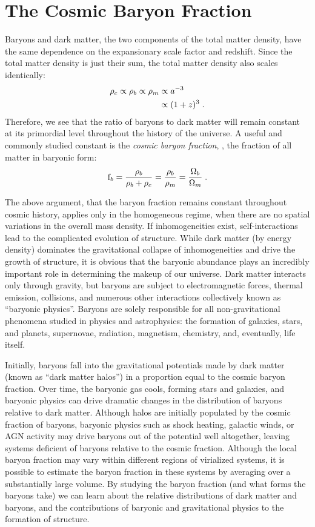 \section{The Cosmic Baryon Fraction}
\label{sec:Intro.Baryons}
Baryons and dark matter, the two components of the total matter
density, have the same dependence on the expansionary scale factor
and redshift. Since the total matter density is just their sum, the
total matter density also scales identically:
\begin{align}
\rho_c \propto \rho_b \propto \rho_m & \propto a^{-3} \nonumber \\
& \propto (1+z)^{3}\;. 
\end{align}
Therefore, we see that the ratio of baryons to dark matter will remain
constant at its primordial level throughout the history of the
universe. A useful and commonly studied constant is the \textit{cosmic
  baryon fraction}, \fb, the fraction of all matter in baryonic form:
\begin{equation}
\textrm{f\ensuremath{_b}} = \frac{\rho_b}{\rho_b + \rho_c} = \frac{\rho_b}{\rho_m} =
\frac{\Omega_b}{\Omega_m}\;.
\end{equation}

The above argument, that the baryon fraction remains constant
throughout cosmic history, applies only in the homogeneous regime,
when there are no spatial variations in the overall mass density. If
inhomogeneities exist, self-interactions lead to the complicated
evolution of structure. While dark matter (by energy density)
dominates the gravitational collapse of inhomogeneities and drive the
growth of structure, it is obvious that the baryonic abundance plays
an incredibly important role in determining the makeup of our
universe. Dark matter interacts only through gravity, but baryons are
subject to electromagnetic forces, thermal emission, collisions, and
numerous other interactions collectively known as ``baryonic
physics''. Baryons are solely responsible for all non-gravitational
phenomena studied in physics and astrophysics: the formation of
galaxies, stars, and planets, supernovae, radiation, magnetism,
chemistry, and, eventually, life itself. 

Initially, baryons fall into the gravitational potentials made by dark
matter (known as ``dark matter halos'') in a proportion equal to the cosmic baryon
fraction. Over time, the baryonic gas cools, forming stars and
galaxies, and baryonic physics can drive dramatic changes in the
distribution of baryons relative to dark matter. Although halos are
initially populated by the cosmic fraction of baryons, baryonic
physics such as shock heating, galactic winds, or AGN activity may
drive baryons out of the potential well altogether, leaving systems
deficient of baryons relative to the cosmic fraction. Although the
local baryon fraction may vary within different regions of virialized
systems, it is possible to estimate the baryon fraction in these
systems by averaging over a substantially large volume. By studying
the baryon fraction (and what forms the baryons take) we can learn
about the relative distributions of dark matter and baryons, and the
contributions of baryonic and gravitational physics to the formation
of structure.

